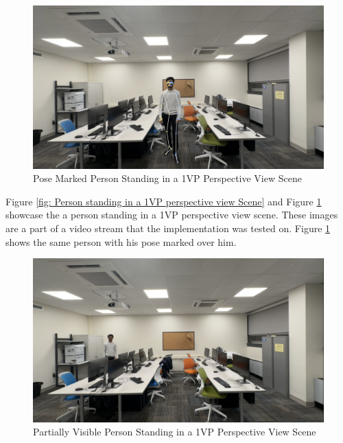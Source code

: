 \documentclass[12pt]{report}
\begin{document}
\begin{figure}[H]
    \centering
    \includegraphics[width=1.0\textwidth]{1vp person pose.png}
    \caption{Pose Marked Person Standing in a 1VP Perspective View Scene}
    \label{fig: Pose marked person standing in a 1VP perspective view Scene}
\end{figure}


Figure \ref{fig: Person standing in a 1VP perspective view Scene} and Figure \ref{fig: Pose marked person standing in a 1VP perspective view Scene} showcase the a person standing in a 1VP perspective view scene. These images are a part of a video stream that the implementation was tested on. Figure \ref{fig: Pose marked person standing in a 1VP perspective view Scene} shows the same person with his pose marked over him.\newline

\begin{figure}[H]
    \centering
    \includegraphics[width=1.0\textwidth]{1vp partial person.jpg}
    \caption{Partially Visible Person Standing in a 1VP Perspective View Scene}
    \label{fig: Partially visible Person standing in a 1VP perspective view Scene}
\end{figure}
\end{document}
